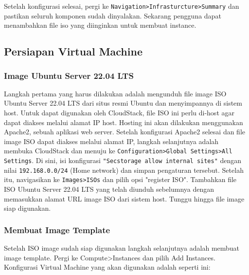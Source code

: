 Setelah konfigurasi selesai, pergi ke \texttt{Navigation>Infrasturcture>Summary} dan pastikan seluruh komponen sudah dinyalakan. Sekarang pengguna dapat menambahkan file iso yang diinginkan untuk membuat instance.

\subsection{Persiapan Virtual Machine}

\subsubsection{Image Ubuntu Server 22.04 LTS}
Langkah pertama yang harus dilakukan adalah mengunduh file image ISO Ubuntu Server 22.04 LTS dari situs resmi Ubuntu dan menyimpannya di sistem host. Untuk dapat digunakan oleh CloudStack, file ISO ini perlu di-host agar dapat diakses melalui alamat IP host. Hosting ini akan dilakukan menggunakan Apache2, sebuah aplikasi web server. Setelah konfigurasi Apache2 selesai dan file image ISO dapat diakses melalui alamat IP, langkah selanjutnya adalah membuka CloudStack dan menuju ke \texttt{Configuration>Global Settings>All Settings}. Di sini, isi konfigurasi \texttt{"Secstorage allow internal sites"} dengan nilai \texttt{192.168.0.0/24} (Home network) dan simpan pengaturan tersebut. Setelah itu, navigasikan ke \texttt{Images>ISOs} dan pilih opsi "register ISO". Tambahkan file ISO Ubuntu Server 22.04 LTS yang telah diunduh sebelumnya dengan memasukkan alamat URL image ISO dari sistem host. Tunggu hingga file image siap digunakan.

\subsubsection{Membuat Image Template}
Setelah ISO image sudah siap digunakan langkah selanjutnya adalah membuat image template. Pergi ke Compute>Instances dan pilih Add Instances. Konfigurasi Virtual Machine yang akan digunakan adalah seperti ini:

